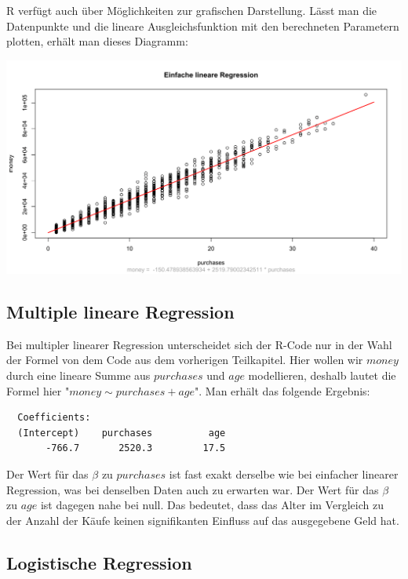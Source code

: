R verfügt auch über Möglichkeiten zur grafischen Darstellung. Lässt man die Datenpunkte und die lineare Ausgleichsfunktion mit den berechneten Parametern plotten, erhält man dieses Diagramm:

\includegraphics[width=\textwidth]{r-simpleLinearRegression}

\subsection{Multiple lineare Regression}
\label{subsection:3:2:3}

Bei multipler linearer Regression unterscheidet sich der R-Code nur in der Wahl der Formel von dem Code aus dem vorherigen Teilkapitel. Hier wollen wir $money$ durch eine \linebreak lineare Summe aus $purchases$ und $age$ modellieren, deshalb lautet die Formel hier \linebreak "$money \sim purchases + age$". Man erhält das folgende Ergebnis:

\begin{verbatim}
  Coefficients:
  (Intercept)    purchases          age
       -766.7       2520.3         17.5
\end{verbatim}

Der Wert für das $\beta$ zu $purchases$ ist fast exakt derselbe wie bei einfacher linearer Regression, was bei denselben Daten auch zu erwarten war. Der Wert für das $\beta$ zu $age$ ist dagegen nahe bei null. Das bedeutet, dass das Alter im Vergleich zu der Anzahl der Käufe keinen signifikanten Einfluss auf das ausgegebene Geld hat.

\subsection{Logistische Regression}
\label{subsection:3:2:4}

